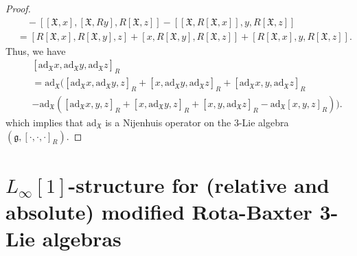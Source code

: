 \documentclass[12pt]{amsart}
\theoremstyle{definition}
\begin{document}
\begin{proof}
\begin{align*}
&\quad-[[\mathfrak{X}, x], [\mathfrak{X},Ry], R[\mathfrak{X}, z]]-[[\mathfrak{X}, R[\mathfrak{X}, x]], y, R[\mathfrak{X}, z]]\\
&=[R[\mathfrak{X}, x], R[\mathfrak{X}, y], z]+[x, R[\mathfrak{X}, y], R[\mathfrak{X}, z]]+[R[\mathfrak{X}, x], y, R[\mathfrak{X}, z]].
\end{align*}
Thus, we have
\begin{align*}
&[\mathrm{ad}_\mathfrak{X}x, \mathrm{ad}_\mathfrak{X}y, \mathrm{ad}_\mathfrak{X}z]_R\\
&=\mathrm{ad}_\mathfrak{X}\big( [\mathrm{ad}_\mathfrak{X}x, \mathrm{ad}_\mathfrak{X}y, z]_R+[x, \mathrm{ad}_\mathfrak{X}y, \mathrm{ad}_\mathfrak{X}z]_R+[\mathrm{ad}_\mathfrak{X}x, y, \mathrm{ad}_\mathfrak{X}z]_R\\
\quad &  -\mathrm{ad}_\mathfrak{X}([\mathrm{ad}_\mathfrak{X}x, y, z]_R+[x, \mathrm{ad}_\mathfrak{X}y, z]_R+[x, y, \mathrm{ad}_\mathfrak{X}z]_R-\mathrm{ad}_\mathfrak{X}[x, y, z]_R)\big).
\end{align*}
 which implies that $\mathrm{ad}_\mathfrak{X}$ is a
 Nijenhuis operator on the $3$-Lie algebra $(\mathfrak{g}, [\cdot, \cdot, \cdot]_R)$.
\end{proof}





\section{$L_\infty[1]$-structure for (relative and absolute) modified Rota-Baxter 3-Lie algebras}\label{L infinty-structure for (relative and absolute) modified Rota-Baxter 3-Lie algebras}
\end{document}
